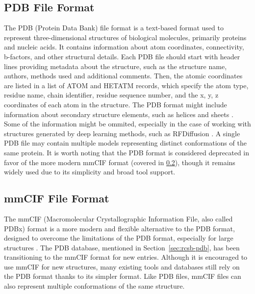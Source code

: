 \subsection{PDB File Format}
\label{sec:pdb-format}

The PDB (Protein Data Bank) file format is a text-based format used to represent three-dimensional structures of biological molecules, primarily proteins and nucleic acids. It contains information about atom coordinates, connectivity, b-factors, and other structural details. Each PDB file should start with header lines providing metadata about the structure, such as the structure name, authors, methods used and additional comments. Then, the atomic coordinates are listed in a list of ATOM and HETATM records, which specify the atom type, residue name, chain identifier, residue sequence number, and the x, y, z coordinates of each atom in the structure. The PDB format might include information about secondary structure elements, such as helices and sheets \cite{westbrook2003pdb}. Some of the information might be ommited, especially in the case of working with structures generated by deep learning methods, such as RFDiffusion \cite{watson2023novo}. A single PDB file may contain multiple models representing distinct conformations of the same protein. It is worth noting that the PDB format is considered deprecated in favor of the more modern mmCIF format (covered in \ref{sec:mmcif-format}), though it remains widely used due to its simplicity and broad tool support.

\begin{figure}[H]
    \centering
    
\end{figure}


\subsection{mmCIF File Format}
\label{sec:mmcif-format}

The mmCIF (Macromolecular Crystallographic Information File, also called PDBx) format is a more modern and flexible alternative to the PDB format, designed to overcome the limitations of the PDB format, especially for large structures \cite{bourne199730}. The PDB database, mentioned in Section~\ref{sec:rcsb-pdb}, has been transitioning to the mmCIF format for new entries. Although it is encouraged to use mmCIF for new structures, many existing tools and databases still rely on the PDB format thanks to its simpler format. Like PDB files, mmCIF files can also represent multiple conformations of the same structure.

